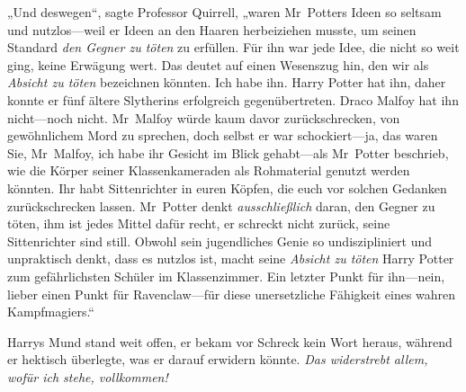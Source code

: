 „Und deswegen“, sagte Professor Quirrell, „waren Mr~Potters Ideen so seltsam und nutzlos—weil er Ideen an den Haaren herbeiziehen musste, um seinen Standard \emph{den Gegner zu töten} zu erfüllen. Für ihn war jede Idee, die nicht so weit ging, keine Erwägung wert. Das deutet auf einen Wesenszug hin, den wir als \emph{Absicht zu töten} bezeichnen könnten. Ich habe ihn. Harry Potter hat ihn, daher konnte er fünf ältere Slytherins erfolgreich gegenübertreten. Draco Malfoy hat ihn nicht—noch nicht. Mr~Malfoy würde kaum davor zurückschrecken, von gewöhnlichem Mord zu sprechen, doch selbst er war schockiert—ja, das waren Sie, Mr~Malfoy, ich habe ihr Gesicht im Blick gehabt—als Mr~Potter beschrieb, wie die Körper seiner Klassenkameraden als Rohmaterial genutzt werden könnten. Ihr habt Sittenrichter in euren Köpfen, die euch vor solchen Gedanken zurückschrecken lassen. Mr~Potter denkt \emph{ausschließlich} daran, den Gegner zu töten, ihm ist jedes Mittel dafür recht, er schreckt nicht zurück, seine Sittenrichter sind still. Obwohl sein jugendliches Genie so undiszipliniert und unpraktisch denkt, dass es nutzlos ist, macht seine \emph{Absicht zu töten} Harry Potter zum gefährlichsten Schüler im Klassenzimmer. Ein letzter Punkt für ihn—nein, lieber einen Punkt für Ravenclaw—für diese unersetzliche Fähigkeit eines wahren Kampfmagiers.“

Harrys Mund stand weit offen, er bekam vor Schreck kein Wort heraus, während er hektisch überlegte, was er darauf erwidern könnte. \emph{Das widerstrebt allem, wofür ich stehe, vollkommen!}

